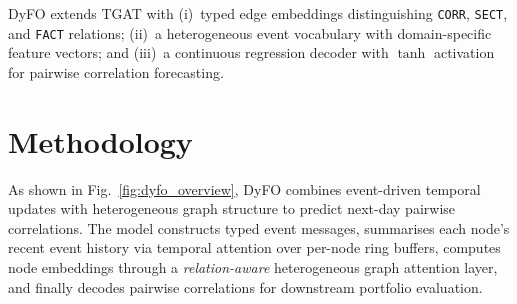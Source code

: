 \documentclass[runningheads]{llncs}
\begin{document}


DyFO extends TGAT with (i)~typed edge embeddings distinguishing \texttt{CORR}, \texttt{SECT}, and \texttt{FACT} relations; (ii)~a heterogeneous event vocabulary with domain-specific feature vectors; and (iii)~a continuous regression decoder with $\tanh$ activation for pairwise correlation forecasting.

\section{Methodology}\label{sec:methodology}

As shown in Fig.~\ref{fig:dyfo_overview}, DyFO combines event-driven temporal updates with heterogeneous graph structure to predict next-day pairwise correlations. The model constructs typed event messages, summarises each node's recent event history via temporal attention over per-node ring buffers, computes node embeddings through a \emph{relation-aware} heterogeneous graph attention layer, and finally decodes pairwise correlations for downstream portfolio evaluation.
\end{document}

